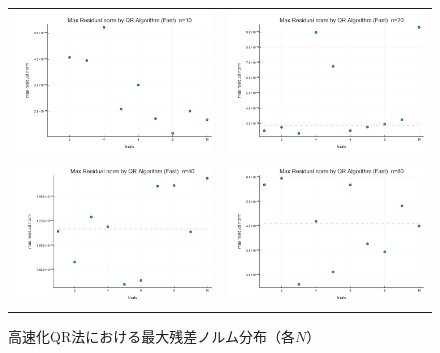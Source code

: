\documentclass[a4paper,11pt]{ltjsarticle}
\begin{document}
\begin{figure}[H]
  \centering
  \begin{tabular}{cc}
    \includegraphics[width=72mm]{graphs/exp6_n10_max_residual.png} &
    \includegraphics[width=72mm]{graphs/exp6_n20_max_residual.png} \\
    \includegraphics[width=72mm]{graphs/exp6_n40_max_residual.png} &
    \includegraphics[width=72mm]{graphs/exp6_n80_max_residual.png} \\
  \end{tabular}
  \caption{高速化QR法における最大残差ノルム分布（各$N$）}
  \label{fig:exp6_residuals}
\end{figure}
\end{document}
